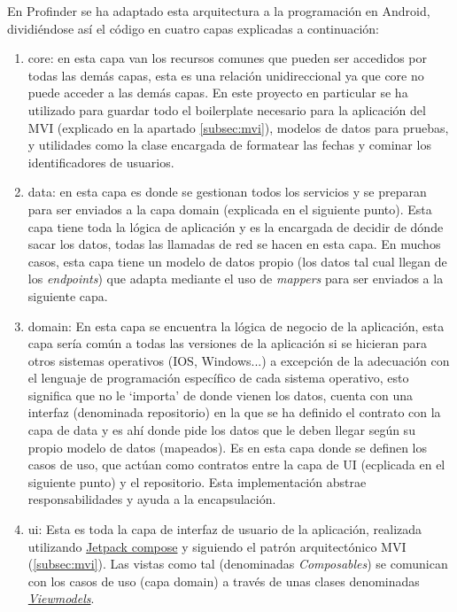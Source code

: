 En Profinder se ha adaptado esta arquitectura a la programación en Android, dividiéndose así el código en cuatro capas explicadas a continuación:
\begin{enumerate}
    \item core: en esta capa van los recursos comunes que pueden ser accedidos por todas las demás capas, esta es una relación unidireccional ya que core no puede acceder a las demás capas. En este proyecto en particular se ha utilizado para guardar todo el boilerplate necesario para la aplicación del MVI (explicado en la apartado \ref{subsec:mvi}), modelos de datos para pruebas, y utilidades como la clase encargada de formatear las fechas y cominar los identificadores de usuarios.
    \item data: en esta capa es donde se gestionan todos los servicios y se preparan para ser enviados a la capa domain (explicada en el siguiente punto). Esta capa tiene toda la lógica de aplicación y es la encargada de decidir de dónde sacar los datos, todas las llamadas de red se hacen en esta capa. En muchos casos, esta capa tiene un modelo de datos propio (los datos tal cual llegan de los \textit{endpoints}) que adapta mediante el uso de \textit{mappers} para ser enviados a la siguiente capa.
    \item domain: En esta capa se encuentra la lógica de negocio de la aplicación, esta capa sería común a todas las versiones de la aplicación si se hicieran para otros sistemas operativos (IOS, Windows...) a excepción de la adecuación con el lenguaje de programación específico de cada sistema operativo, esto significa que no le ‘importa’ de donde vienen los datos, cuenta con una interfaz (denominada repositorio) en la que se ha definido el contrato con la capa de data y es ahí donde pide los datos que le deben llegar según su propio modelo de datos (mapeados). Es en esta capa donde se definen los casos de uso, que actúan como contratos entre la capa de UI (ecplicada en el siguiente punto) y el repositorio. Esta implementación abstrae responsabilidades y ayuda a la encapsulación. 
    \item ui: Esta es toda la capa de interfaz de usuario de la aplicación, realizada utilizando \hyperlink{subsec:compose}{Jetpack compose} y siguiendo el patrón arquitectónico  MVI (\ref{subsec:mvi}). Las vistas como tal (denominadas \textit{Composables}) se comunican con los casos de uso (capa domain) a través de unas clases denominadas \href{https://developer.android.com/topic/libraries/architecture/viewmodel}{\textit{Viewmodels}}.

\end{enumerate}
